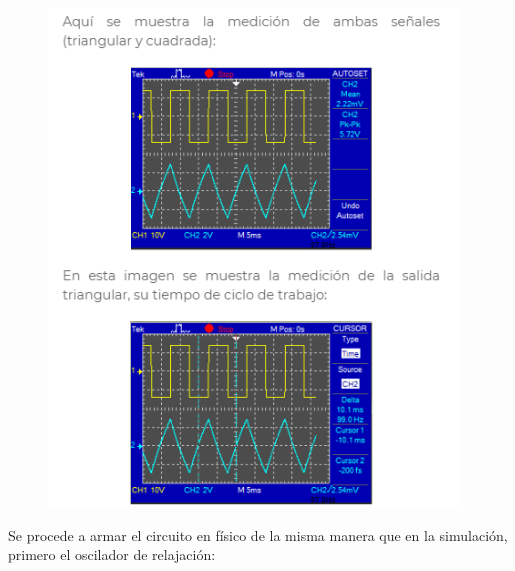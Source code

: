 \documentclass[12pt]{article}
\begin{document}

\par




\begin{figure}[H]
	\begin{Center}
		\includegraphics[width=4.29in,height=5.2in]{./media/image9.png}
	\end{Center}
\end{figure}



\par

\begin{Center}
\textcolor[HTML]{656565}{Se procede a armar el circuito en físico de la misma manera que en la simulación, primero el oscilador de relajación:}
\end{Center}\par



\end{document}
